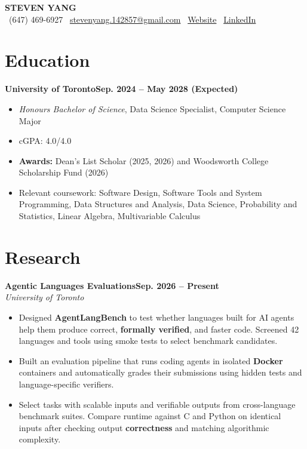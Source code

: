 \documentclass[10pt]{article}
\renewcommand{\LARGE}{\fontsize{16.76pt}{21.34pt}\selectfont}
\newcommand{\contactsep}{\hspace{10pt}\textbar\hspace{10pt}}
\newcommand{\roleline}[2]{\textbf{#1}\hfill \textbf{#2}}
\newcommand{\experienceline}[2]{\textbf{#1}\hfill \textbf{#2}}
\newcommand{\orgline}[2]{\textit{#1}\hfill \textit{#2}}
\begin{document}
\begin{center}
    {\LARGE \textbf{STEVEN YANG}} \\[6pt]
    \faPhone\ (647) 469-6927
    \contactsep
    \faEnvelope\ \href{mailto:stevenyang.142857@gmail.com}{stevenyang.142857@gmail.com}
    \contactsep
    \faGlobe\ \href{https://Sytion06.github.io}{Website}
    \contactsep
    \faLinkedin\ \href{https://www.linkedin.com/in/steven-yang-7760293a3/}{LinkedIn}
\end{center}

\section*{Education}
\roleline{University of Toronto}{Sep. 2024 -- May 2028 (Expected)}
\begin{itemize}
  \item \textit{Honours Bachelor of Science}, Data Science Specialist, Computer Science Major
  \item cGPA: 4.0/4.0
  \item \textbf{Awards:} Dean’s List Scholar (2025, 2026) and Woodsworth College Scholarship Fund (2026)
  \item Relevant coursework: Software Design, Software Tools and System Programming, Data Structures and Analysis, Data Science, Probability and Statistics, Linear Algebra, Multivariable Calculus
\end{itemize}

\section*{Research}
\experienceline{Agentic Languages Evaluations}{Sep. 2026 -- Present}\\[-1pt]
\orgline{University of Toronto}{}
\begin{itemize}
  \item Designed \textbf{AgentLangBench} to test whether languages built for AI agents help them produce correct, \textbf{formally verified}, and faster code. Screened 42 languages and tools using smoke tests to select benchmark candidates.
  \item Built an evaluation pipeline that runs coding agents in isolated \textbf{Docker} containers and automatically grades their submissions using hidden tests and language-specific verifiers.
  \item Select tasks with scalable inputs and verifiable outputs from cross-language benchmark suites. Compare runtime against C and Python on identical inputs after checking output \textbf{correctness} and matching algorithmic complexity.
\end{itemize}
\end{document}
